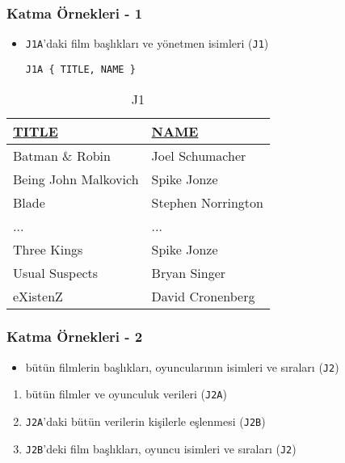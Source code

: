 \documentclass[dvipsnames]{beamer}
\theoremstyle{plain}
\begin{document}
\begin{frame}[fragile]
  \frametitle{Katma Örnekleri - 1}

    \begin{itemize}
      \item \texttt{J1A}'daki film başlıkları ve yönetmen isimleri
         (\texttt{J1})

    \begin{lstlisting}
J1A { TITLE, NAME }
    \end{lstlisting}
    \end{itemize}

    \vspace{-10pt}
    \begin{tiny}
    \begin{table}
      \caption{J1}
      \begin{tabular}{|l|l|}\hline
\underline{TITLE}    & \underline{NAME}\\[2pt]\hline\hline
Batman \& Robin      & Joel Schumacher \\\hline
Being John Malkovich & Spike Jonze     \\\hline
Blade                & Stephen Norrington\\\hline
...                  & ...             \\\hline
Three Kings          & Spike Jonze     \\\hline
Usual Suspects       & Bryan Singer    \\\hline
eXistenZ             & David Cronenberg\\\hline
      \end{tabular}
    \end{table}
    \end{tiny}
\end{frame}

\begin{frame}
  \frametitle{Katma Örnekleri - 2}

    \begin{itemize}
      \item bütün filmlerin başlıkları, oyuncularının isimleri ve sıraları
        (\texttt{J2})
    \end{itemize}

    \pause
    \begin{enumerate}
      \item bütün filmler ve oyunculuk verileri (\texttt{J2A})
      \item \texttt{J2A}'daki bütün verilerin kişilerle eşlenmesi (\texttt{J2B})
      \item \texttt{J2B}'deki film başlıkları, oyuncu isimleri ve sıraları
	(\texttt{J2})
    \end{enumerate}
\end{frame}
\end{document}
